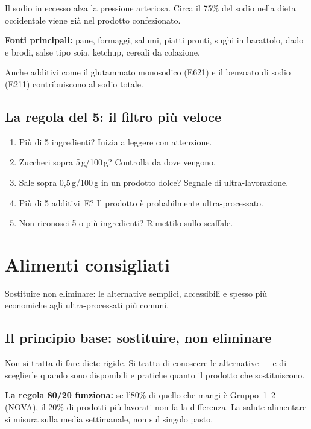 \documentclass[a5paper,12pt,oneside,openany]{book}
\begin{document}
Il sodio in eccesso alza la pressione arteriosa. Circa il 75\% del sodio
nella dieta occidentale viene già nel prodotto confezionato.

\textbf{Fonti principali:} pane, formaggi, salumi, piatti pronti, sughi
in barattolo, dado e brodi, salse tipo soia, ketchup, cereali da colazione.

Anche additivi come il glutammato monosodico (E621) e il benzoato di
sodio (E211) contribuiscono al sodio totale.

\section{La regola del 5: il filtro più veloce}

\begin{enumerate}
  \item Più di 5 ingredienti? Inizia a leggere con attenzione.
  \item Zuccheri sopra 5\,g/100\,g? Controlla da dove vengono.
  \item Sale sopra 0,5\,g/100\,g in un prodotto dolce? Segnale di
    ultra-lavorazione.
  \item Più di 5 additivi~E? Il prodotto è probabilmente ultra-processato.
  \item Non riconosci 5 o più ingredienti? Rimettilo sullo scaffale.
\end{enumerate}

\chapter{Alimenti consigliati}

Sostituire non eliminare: le alternative semplici, accessibili e spesso
più economiche agli ultra-processati più comuni.

\section{Il principio base: sostituire, non eliminare}

Non si tratta di fare diete rigide. Si tratta di conoscere le alternative
--- e di sceglierle quando sono disponibili e pratiche quanto il prodotto
che sostituiscono.

\textbf{La regola 80/20 funziona:} se l'80\% di quello che mangi è
Gruppo~1--2 (NOVA), il 20\% di prodotti più lavorati non fa la differenza.
La salute alimentare si misura sulla media settimanale, non sul singolo
pasto.
\end{document}
